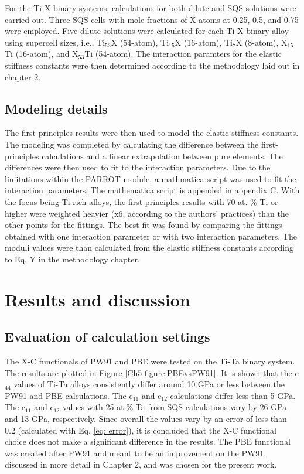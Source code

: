 For the Ti-X binary systems, calculations for both dilute and SQS solutions were carried out. Three SQS cells with mole fractions of X atoms at 0.25, 0.5, and 0.75 were employed. Five dilute solutions were calculated for each Ti-X binary alloy using supercell sizes, i.e., Ti$_{53}$X (54-atom), Ti$_{15}$X (16-atom), Ti$_{7}$X (8-atom), X$_{15}$Ti (16-atom), and X$_{53}$Ti (54-atom). The interaction paramters for the  elastic stiffness constants were then determined according to the methodology laid out in chapter 2. 

\subsection{Modeling details}

  The first-principles results were then used to model the elastic stiffness constants. The modeling was completed by calculating the difference between the first-principles calculations and a linear extrapolation between pure elements. The differences were then used to fit to the interaction parameters. Due to the limitations within the PARROT module, a mathmatica script was used to fit the interaction parameters. The mathematica script is appended in appendix C. With the focus being Ti-rich alloys, the first-principles results with 70 at. \% Ti or higher were weighted heavier (x6, according to the authors' practices) than the other points for the fittings. The best fit was found by comparing the fittings obtained with one interaction parameter or with two interaction parameters. The moduli values were than calculated from the elastic stiffness constants according to Eq. Y in the methodology chapter.

\section{Results and discussion}

\subsection{Evaluation of calculation settings}

The X-C functionals of PW91 and PBE were tested on the Ti-Ta binary system. The results are plotted in Figure \ref{Ch5-figure:PBEvsPW91}. It is shown that the c$_{44}$ values of Ti-Ta alloys consistently differ around 10 GPa or less between the PW91 and PBE calculations. The c$_{11}$ and c$_{12}$ calculations differ less than 5 GPa. The c$_{11}$ and c$_{12}$ values with 25 at.$\%$ Ta from SQS calculations vary by 26 GPa and 13 GPa, respectively. Since overall the values vary by an error of less than 0.2 (calculated with Eq. \ref{eq: error}), it is concluded that the X-C functional choice does not make a significant difference in the results. The PBE functional was created after PW91 and meant to be an improvement on the PW91, discussed in more detail in Chapter 2, and was chosen for the present work. 

